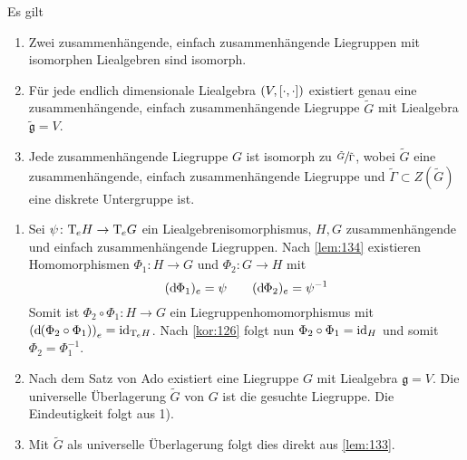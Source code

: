 \begin{satz}[{name=[{Liegruppen-Liealgebren-Zusammenhang im einfach zusammenhängenden Fall}]},label=satz:135]
	Es gilt
	\begin{enumerate}[1)]
		\item Zwei zusammenhängende, einfach zusammenhängende Liegruppen mit isomorphen Liealgebren sind isomorph.
		\item Für jede endlich dimensionale Liealgebra $(V, \benbrace*{\cdot,\cdot })$ existiert genau eine zusammenhängende, einfach zusammenhängende Liegruppe $\tilde{G}$ mit Liealgebra $\tilde{\mathfrak{g}}=V$.
		\item Jede zusammenhängende Liegruppe $G$ ist isomorph zu $\sfrac{\tilde{G}}{\tilde{\Gamma}}$, wobei $\tilde{G}$ eine zusammenhängende, einfach zusammenhängende Liegruppe und $\tilde{\Gamma} \subset Z(\tilde{G})$ eine diskrete Untergruppe ist.
	\end{enumerate}
\end{satz}
\begin{beweis}
	\begin{enumerate}[1)]
		\item Sei $\psi \colon \Tmap_e H \to \Tmap_e G$ ein Liealgebrenisomorphismus, $H,G$ zusammenhängende und einfach zusammenhängende Liegruppen.
		Nach \autoref{lem:134} existieren Homomorphismen $\Phi_1 \colon H \to G$ und $\Phi_2 \colon G \to H$ mit
		\[
			(\mathd \Phi_1)_e = \psi \qquad (\mathd \Phi_2)_e = \psi^{-1}
		\]
		Somit ist $\Phi_2 \circ  \Phi_1 \colon H \to G$ ein Liegruppenhomomorphismus mit $\enbrace*{\mathd (\Phi_2 \circ \Phi_1)}_e = \id_{\Tmap_e H}$.
		Nach \autoref{kor:126} folgt nun $\Phi_2 \circ \Phi_1= \id_H$ und somit $\Phi_2 = \Phi_1^{-1}$.
		\item Nach dem Satz von Ado existiert eine Liegruppe $G$ mit Liealgebra $\mathfrak{g}=V$.
		Die universelle Überlagerung $\tilde{G}$ von $G$ ist die gesuchte Liegruppe.
		Die Eindeutigkeit folgt aus 1).
		\item Mit $\widetilde{G}$ als universelle Überlagerung folgt dies direkt aus \autoref{lem:133}.\qedhere
	\end{enumerate}
\end{beweis}

